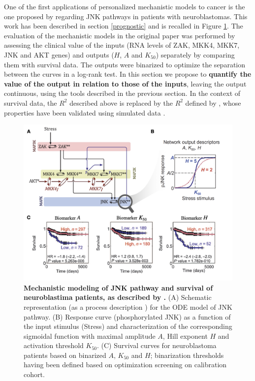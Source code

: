 \documentclass[a4paper,12pt,twoside,onecolumn,openright,final,oldfontcommands]{memoir}
\begin{document}
One of the first applications of personalized mechanistic models to
cancer is the one proposed by \citet{fey2015signaling} regarding JNK
pathways in patients with neuroblastomas. This work has been described
in section \ref{prognostic} and is recalled in Figure \ref{fig:fey2}.
The evaluation of the mechanistic models in the original paper was
performed by assessing the clinical value of the inputs (RNA levels of
ZAK, MKK4, MKK7, JNK and AKT genes) and outputs (\(H\), \(A\) and
\(K_{50}\)) separately by comparing them with survival data. The outputs
were binarized to optimize the separation between the curves in a
log-rank test. In this section we propose to \textbf{quantify the value
of the output in relation to those of the inputs}, leaving the output
continuous, using the tools described in the previous section. In the
context of survival data, the \(R^2\) described above is replaced by the
\(R^2\) defined by \citet{royston2004new}, whose properties have been
validated using simulated data \citep{choodari2012simulation}.

\begin{figure}

{\centering \includegraphics[width=0.9\linewidth]{fig/fey} 

}

\caption[Mechanistic modeling of JNK pathway and survival of neuroblastima patients, as described by Fey \emph{et al}.]{\textbf{Mechanistic modeling of JNK pathway and
survival of neuroblastima patients, as described by
\citet{fey2015signaling}.} (A) Schematic representation (as a process
description \citep{le2015quantitative}) for the ODE model of JNK
pathway. (B) Response curve (phosphorylated JNK) as a function of the
input stimulus (Stress) and characterization of the corresponding
sigmoidal function with maximal amplitude \(A\), Hill exponent \(H\) and
activation threshold \(K_{50}\). (C) Survival curves for neuroblastoma
patients based on binarized \(A\), \(K_{50}\) and \(H\); binarization
thresholds having been defined based on optimization screening on
calibration cohort.}\label{fig:fey2}
\end{figure}
\end{document}
